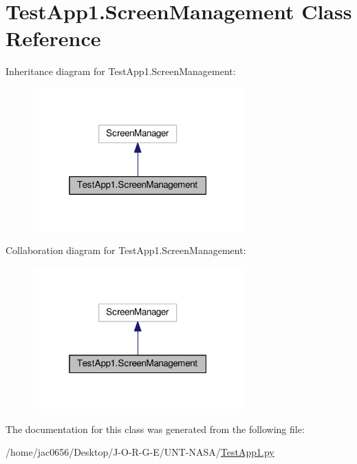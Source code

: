 \hypertarget{classTestApp1_1_1ScreenManagement}{}\section{Test\+App1.\+Screen\+Management Class Reference}
\label{classTestApp1_1_1ScreenManagement}


Inheritance diagram for Test\+App1.\+Screen\+Management\+:
\nopagebreak
\begin{figure}[H]
\begin{center}
\leavevmode
\includegraphics[width=229pt]{classTestApp1_1_1ScreenManagement__inherit__graph}
\end{center}
\end{figure}


Collaboration diagram for Test\+App1.\+Screen\+Management\+:
\nopagebreak
\begin{figure}[H]
\begin{center}
\leavevmode
\includegraphics[width=229pt]{classTestApp1_1_1ScreenManagement__coll__graph}
\end{center}
\end{figure}


The documentation for this class was generated from the following file\+:\begin{DoxyCompactItemize}
\item 
/home/jac0656/\+Desktop/\+J-\/\+O-\/\+R-\/\+G-\/\+E/\+U\+N\+T-\/\+N\+A\+S\+A/\hyperlink{TestApp1_8py}{Test\+App1.\+py}\end{DoxyCompactItemize}
